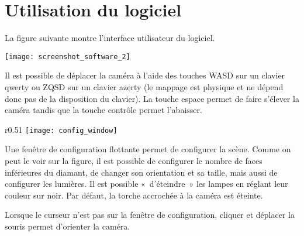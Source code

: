 \section{Utilisation du logiciel}

La figure suivante montre l'interface utilisateur du logiciel.

{\centering \texttt{[image: screenshot\_software\_2]}}

Il est possible de déplacer la caméra à l'aide des touches WASD sur un clavier qwerty ou ZQSD sur un clavier azerty
(le mappage est physique et ne dépend donc pas de la disposition du clavier).
La touche espace permet de faire s'élever la caméra tandis que la touche contrôle permet l'abaisser.

\begin{wrapfigure}{r}{0.51\textwidth}
    \centering
    \texttt{[image: config\_window]}
\end{wrapfigure}
Une fenêtre de configuration flottante permet de configurer la scène.
Comme on peut le voir sur la figure, il est possible de configurer le nombre de
faces inférieures du diamant, de changer son orientation et sa taille, mais aussi
de configurer les lumières.
Il est possible «~d'éteindre~» les lampes en réglant leur couleur sur noir.
Par défaut, la torche accrochée à la caméra est éteinte.

Lorsque le curseur n'est pas sur la fenêtre de configuration, cliquer et déplacer la souris permet
d'orienter la caméra.


